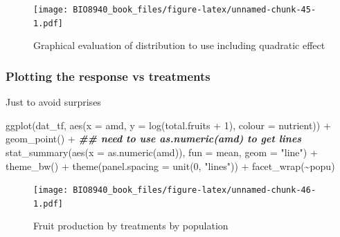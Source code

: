 \documentclass[
  12pt,
]{book}
\newenvironment{Shaded}{\begin{snugshade}}{\end{snugshade}}
\newcommand{\AttributeTok}[1]{\textcolor[rgb]{0.77,0.63,0.00}{#1}}
\newcommand{\DecValTok}[1]{\textcolor[rgb]{0.00,0.00,0.81}{#1}}
\newcommand{\DocumentationTok}[1]{\textcolor[rgb]{0.56,0.35,0.01}{\textbf{\textit{#1}}}}
\newcommand{\FunctionTok}[1]{\textcolor[rgb]{0.00,0.00,0.00}{#1}}
\newcommand{\NormalTok}[1]{#1}
\newcommand{\SpecialCharTok}[1]{\textcolor[rgb]{0.00,0.00,0.00}{#1}}
\newcommand{\StringTok}[1]{\textcolor[rgb]{0.31,0.60,0.02}{#1}}
\begin{document}
\begin{figure}
\centering
\texttt{[image: BIO8940\_book\_files/figure-latex/unnamed-chunk-45-1.pdf]}
\caption{\label{fig:unnamed-chunk-45}Graphical evaluation of distribution to use including quadratic effect}
\end{figure}

\hypertarget{plotting-the-response-vs-treatments}{%
\subsubsection{Plotting the response vs treatments}\label{plotting-the-response-vs-treatments}}

Just to avoid surprises

\begin{Shaded}
\begin{Highlighting}[]
\FunctionTok{ggplot}\NormalTok{(dat\_tf, }\FunctionTok{aes}\NormalTok{(}\AttributeTok{x =}\NormalTok{ amd, }\AttributeTok{y =} \FunctionTok{log}\NormalTok{(total.fruits }\SpecialCharTok{+} \DecValTok{1}\NormalTok{), }\AttributeTok{colour =}\NormalTok{ nutrient)) }\SpecialCharTok{+}
  \FunctionTok{geom\_point}\NormalTok{() }\SpecialCharTok{+}
  \DocumentationTok{\#\# need to use as.numeric(amd) to get lines}
  \FunctionTok{stat\_summary}\NormalTok{(}\FunctionTok{aes}\NormalTok{(}\AttributeTok{x =} \FunctionTok{as.numeric}\NormalTok{(amd)), }\AttributeTok{fun =}\NormalTok{ mean, }\AttributeTok{geom =} \StringTok{"line"}\NormalTok{) }\SpecialCharTok{+}
  \FunctionTok{theme\_bw}\NormalTok{() }\SpecialCharTok{+}
  \FunctionTok{theme}\NormalTok{(}\AttributeTok{panel.spacing =} \FunctionTok{unit}\NormalTok{(}\DecValTok{0}\NormalTok{, }\StringTok{"lines"}\NormalTok{)) }\SpecialCharTok{+}
  \FunctionTok{facet\_wrap}\NormalTok{(}\SpecialCharTok{\textasciitilde{}}\NormalTok{popu)}
\end{Highlighting}
\end{Shaded}

\begin{figure}
\centering
\texttt{[image: BIO8940\_book\_files/figure-latex/unnamed-chunk-46-1.pdf]}
\caption{\label{fig:unnamed-chunk-46}Fruit production by treatments by population}
\end{figure}
\end{document}
